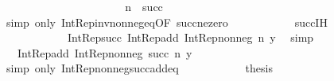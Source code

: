 \begin{isabellebody}
\ \ \ \ \ \ \ \ \ \ {\isacharparenright}{\kern0pt}{\isachardoublequoteclose}\isanewline
\ \ \ \ \ \ \ \ \ \ \isamarkupfalse%
\ {\isacartoucheopen}n\ {\isacharequal}{\kern0pt}\ succ\ {\isacharunderscore}{\kern0pt}\ {\isacartoucheclose}\ \isamarkupfalse%
\ {\isacharparenleft}{\kern0pt}simp\ only{\isacharcolon}{\kern0pt}\ Int{\isacharunderscore}{\kern0pt}Rep{\isacharunderscore}{\kern0pt}inv{\isacharunderscore}{\kern0pt}nonneg{\isacharunderscore}{\kern0pt}eq{\isacharbrackleft}{\kern0pt}OF\ succ{\isacharunderscore}{\kern0pt}ne{\isacharunderscore}{\kern0pt}zero{\isacharbrackright}{\kern0pt}{\isacharparenright}{\kern0pt}\isanewline
\ \ \ \ \ \ \ \ \isamarkupfalse%
\ \isamarkupfalse%
\ succ{\isachardot}{\kern0pt}IH\ \isamarkupfalse%
\isanewline
\ \ \ \ \ \ \ \ \ \ {\isachardoublequoteopen}{\isachardot}{\kern0pt}{\isachardot}{\kern0pt}{\isachardot}{\kern0pt}\ {\isacharequal}{\kern0pt}\ Int{\isacharunderscore}{\kern0pt}Rep{\isacharunderscore}{\kern0pt}succ\ {\isacharparenleft}{\kern0pt}Int{\isacharunderscore}{\kern0pt}Rep{\isacharunderscore}{\kern0pt}add\ {\isacharparenleft}{\kern0pt}Int{\isacharunderscore}{\kern0pt}Rep{\isacharunderscore}{\kern0pt}nonneg\ n{\isacharparenright}{\kern0pt}\ y{\isacharparenright}{\kern0pt}{\isachardoublequoteclose}\ \isamarkupfalse%
\ simp\isanewline
\ \ \ \ \ \ \ \ \isamarkupfalse%
\ \isamarkupfalse%
\ {\isachardoublequoteopen}{\isachardot}{\kern0pt}{\isachardot}{\kern0pt}{\isachardot}{\kern0pt}\ {\isacharequal}{\kern0pt}\ Int{\isacharunderscore}{\kern0pt}Rep{\isacharunderscore}{\kern0pt}add\ {\isacharparenleft}{\kern0pt}Int{\isacharunderscore}{\kern0pt}Rep{\isacharunderscore}{\kern0pt}nonneg\ {\isacharparenleft}{\kern0pt}succ\ n{\isacharparenright}{\kern0pt}{\isacharparenright}{\kern0pt}\ y{\isachardoublequoteclose}\isanewline
\ \ \ \ \ \ \ \ \ \ \isamarkupfalse%
\ {\isacharparenleft}{\kern0pt}simp\ only{\isacharcolon}{\kern0pt}\ Int{\isacharunderscore}{\kern0pt}Rep{\isacharunderscore}{\kern0pt}nonneg{\isacharunderscore}{\kern0pt}succ{\isacharunderscore}{\kern0pt}add{\isacharunderscore}{\kern0pt}eq{\isacharparenright}{\kern0pt}\isanewline
\ \ \ \ \ \ \ \ \isamarkupfalse%
\ \isamarkupfalse%
\ {\isacharquery}{\kern0pt}thesis\ \isacommand{{\isachardot}{\kern0pt}}\isamarkupfalse%
\isanewline
\ \ \ \ \ \ \isamarkupfalse%
\isanewline
\ \ \ \ \isamarkupfalse%
\isanewline
\ \ \isacommand{{\isacharbraceright}{\kern0pt}}\isamarkupfalse%

\end{isabellebody}
